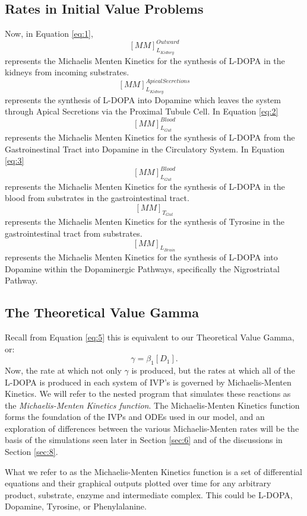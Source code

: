 \documentclass[smallextended]{svjour3}
\begin{document}
\subsection{Rates in Initial Value Problems}
Now, in Equation \ref{eq:1}, $$[MM]_{L_{Kidney}}^{Outward}$$ represents the Michaelis Menten Kinetics for the synthesis of L-DOPA in the kidneys from incoming substrates.  $$[MM]_{L_{Kidney}}^{Apical Secretions}$$ represents the synthesis of L-DOPA into Dopamine which leaves the system through Apical Secretions via the Proximal Tubule Cell. \cite{Ref28} \cite{Ref29}
In Equation \ref{eq:2} $$[MM]_{L_{Gut}}^{Blood}$$ represents the Michaelis Menten Kinetics for the synthesis of L-DOPA from the Gastroinestinal Tract into Dopamine in the Circulatory System. 
In Equation \ref{eq:3} $$[MM]_{L_{Gut}}^{Blood}$$ represents the Michaelis Menten Kinetics for the synthesis of L-DOPA in the blood from substrates in the gastrointestinal tract. $$[MM]_{T_{Gut}}$$ represents the Michaelis Menten Kinetics for the synthesis of Tyrosine in the gastrointestinal tract from substrates.  $$[MM]_{L_{Brain}}$$ represents the Michaelis Menten Kinetics for the synthesis of L-DOPA into Dopamine within the Dopaminergic Pathways, specifically the Nigrostriatal Pathway.
\subsection{The Theoretical Value Gamma}                                 
Recall from Equation \ref{eq:5} this is equivalent to our Theoretical Value Gamma, or: $$\gamma = \beta_1 [D_1].$$  
%
Now, the rate at which not only $\gamma$ is produced, but the rates at which all of the L-DOPA is produced in each system of IVP's is governed by Michaelis-Menten Kinetics.  We will refer to the nested program that simulates these reactions as the \textit{Michaelis-Menten Kinetics function}.  The Michaelis-Menten Kinetics function forms the foundation of the IVPs and ODEs used in our model, and an exploration of differences between the various Michaelis-Menten rates will be the basis of the simulations seen later in Section \ref{sec:6} and of the discussions in Section \ref{sec:8}.

What we refer to as the Michaelis-Menten Kinetics function is a set of differential equations and their graphical outputs plotted over time for any arbitrary product, substrate, enzyme and intermediate complex.  This could be L-DOPA, Dopamine, Tyrosine, or Phenylalanine.
\end{document}
